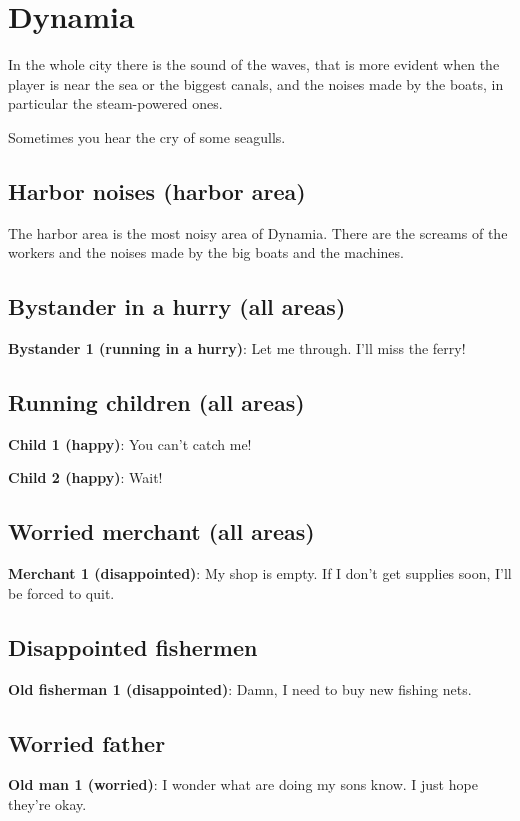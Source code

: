 \section{Dynamia}

In the whole city there is the sound of the waves, that is more evident when the player is near the sea or the biggest canals, and the noises made by the boats, in particular the steam-powered ones.

Sometimes you hear the cry of some seagulls.

\subsection{Harbor noises (harbor area)}
The harbor area is the most noisy area of Dynamia. There are the screams of the workers and the noises made by the big boats and the machines.

\subsection{Bystander in a hurry (all areas)}
\textbf{Bystander 1 (running in a hurry)}: Let me through. I'll miss the ferry!

\subsection{Running children (all areas)}
\textbf{Child 1 (happy)}: You can't catch me!

\textbf{Child 2 (happy)}: Wait!

\subsection{Worried merchant (all areas)}
\textbf{Merchant 1 (disappointed)}: My shop is empty. If I don't get supplies soon, I'll be forced to quit.

\subsection{Disappointed fishermen}
\textbf{Old fisherman 1 (disappointed)}: Damn, I need to buy new fishing nets.

\subsection{Worried father}
\textbf{Old man 1 (worried)}: I wonder what are doing my sons know. I just hope they're okay.

